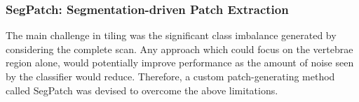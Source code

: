 \documentclass{article}
\begin{document}
\subsubsection{SegPatch: Segmentation-driven Patch Extraction}
The main challenge in tiling was the significant class imbalance generated by considering the complete scan. Any approach which could focus on the vertebrae region alone, would potentially improve performance as the amount of noise seen by the classifier would reduce.
Therefore, a custom patch-generating method called SegPatch was devised to overcome the above limitations.

\end{document}
